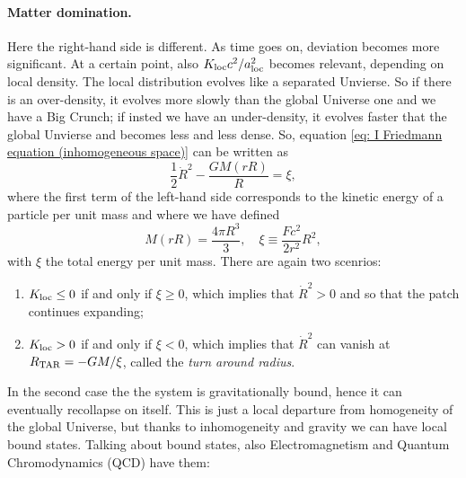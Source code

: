 \paragraph{Matter domination.} Here the right-hand side is different. As time goes on, deviation becomes more significant. At a certain point, also $K_{\mathrm{loc}}c^2/a^2_{\mathrm{loc}}$ becomes relevant, depending on local density. The local distribution evolves like a separated Unvierse. So if there is an over-density, it evolves more slowly than the global Universe one and we have a Big Crunch; if insted we have an under-density, it evolves faster that the global Unvierse and becomes less and less dense. So, equation \eqref{eq: I Friedmann equation (inhomogeneous space)} can be written as 
\begin{equation}
    \frac{1}{2}\dot{R}^2 - \frac{GM(rR)}{R} = \xi,
\end{equation}
where the first term of the left-hand side corresponds to the kinetic energy of a particle per unit mass and where we have defined 
\begin{equation}
    M(rR) = \frac{4\pi R^3}{3},\quad \xi \equiv \frac{Fc^2}{2r^2}R^2,
\end{equation}
with $\xi$ the total energy per unit mass. There are again two scenrios:
\begin{enumerate}
    \item $K_{\mathrm{loc}} \le 0$ if and only if $\xi \ge 0$, which implies that $\dot{R}^2 > 0$ and so that the patch continues expanding;
    \item $K_{\mathrm{loc}} > 0$ if and only if $\xi < 0$, which implies that $\dot{R}^2$ can vanish at $R_{\mathrm{TAR}} = -GM/\xi$, called the \emph{turn around radius}.  
\end{enumerate}
In the second case the the system is gravitationally bound, hence it can eventually recollapse on itself. This is just a local departure from homogeneity of the global Universe, but thanks to inhomogeneity and gravity we can have local bound states. Talking about bound states, also Electromagnetism and Quantum Chromodynamics (QCD) have them:
